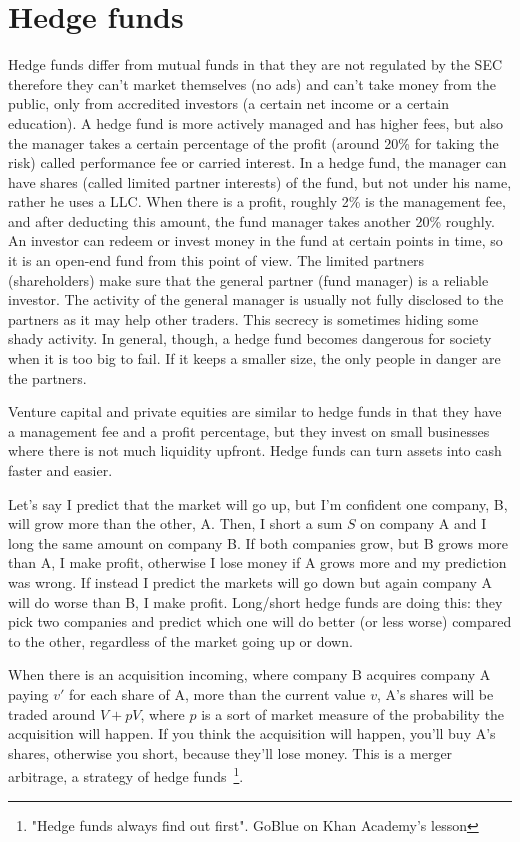 \section{Hedge funds}
Hedge funds differ from mutual funds in that they are not regulated by the SEC therefore they can't market themselves (no ads) and can't take money from the public, only from accredited investors (a certain net income or a certain education). A hedge fund is more actively managed and has higher fees, but also the manager takes a certain percentage of the profit (around 20\% for taking the risk) called performance fee or carried interest.
In a hedge fund, the manager can have shares (called limited partner interests) of the fund, but not under his name, rather he uses a LLC. When there is a profit, roughly 2\% is the management fee, and after deducting this amount, the fund manager takes another 20\% roughly. An investor can redeem or invest money in the fund at certain points in time, so it is an open-end fund from this point of view.
The limited partners (shareholders) make sure that the general partner (fund manager) is a reliable investor. The activity of the general manager is usually not fully disclosed to the partners as it may help other traders. This secrecy is sometimes hiding some shady activity. In general, though, a hedge fund becomes dangerous for society when it is too big to fail. If it keeps a smaller size, the only people in danger are the partners. 

Venture capital and private equities are similar to hedge funds in that they have a management fee and a profit percentage, but they invest on small businesses where there is not much liquidity upfront. Hedge funds can turn assets into cash faster and easier.

Let's say I predict that the market will go up, but I'm confident one company, B, will grow more than the other, A. Then, I short a sum $S$ on company A and I long the same amount on company B. If both companies grow, but B grows more than A, I make profit, otherwise I lose money if A grows more and my prediction was wrong. If instead I predict the markets will go down but again company A will do worse than B, I make profit. Long/short hedge funds are doing this: they pick two companies and predict which one will do better (or less worse) compared to the other, regardless of the market going up or down.

When there is an acquisition incoming, where company B acquires company A paying $v'$ for each share of A, more than the current value $v$, A's shares will be traded around $V + pV$, where $p$ is a sort of market measure of the probability the acquisition will happen. If you think the acquisition will happen, you'll buy A's shares, otherwise you short, because they'll lose money. This is a merger arbitrage, a strategy of hedge funds~\footnote{"Hedge funds always find out first". GoBlue on Khan Academy's lesson}.

